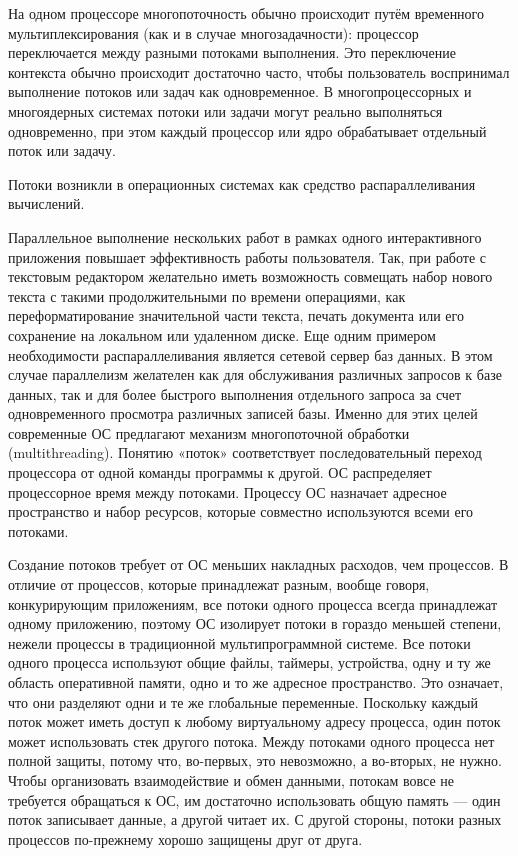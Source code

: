 \documentclass[a4paper,12pt]{report}
\begin{document}
На одном процессоре многопоточность обычно происходит путём временного мультиплексирования (как и в случае многозадачности): процессор переключается между разными потоками выполнения. Это переключение контекста обычно происходит достаточно часто, чтобы пользователь воспринимал выполнение потоков или задач как одновременное. В многопроцессорных и многоядерных системах потоки или задачи могут реально выполняться одновременно, при этом каждый процессор или ядро обрабатывает отдельный поток или задачу.

Потоки возникли в операционных системах как средство распараллеливания вычислений.

Параллельное выполнение нескольких работ в рамках одного интерактивного приложения повышает эффективность работы пользователя. Так, при работе с текстовым редактором желательно иметь возможность совмещать набор нового текста с такими продолжительными по времени операциями, как переформатирование значительной части текста, печать документа или его сохранение на локальном или удаленном диске. Еще одним примером необходимости распараллеливания является сетевой сервер баз данных. В этом случае параллелизм желателен как для обслуживания различных запросов к базе данных, так и для более быстрого выполнения отдельного запроса за счет одновременного просмотра различных записей базы. Именно для этих целей современные ОС предлагают механизм многопоточной обработки (multithreading). Понятию «поток» соответствует последовательный переход процессора от одной команды программы к другой. ОС распределяет процессорное время между потоками. Процессу ОС назначает адресное пространство и набор ресурсов, которые совместно используются всеми его потоками. 

Создание потоков требует от ОС меньших накладных расходов, чем процессов. В отличие от процессов, которые принадлежат разным, вообще говоря, конкурирующим приложениям, все потоки одного процесса всегда принадлежат одному приложению, поэтому ОС изолирует потоки в гораздо меньшей степени, нежели процессы в традиционной мультипрограммной системе. Все потоки одного процесса используют общие файлы, таймеры, устройства, одну и ту же область оперативной памяти, одно и то же адресное пространство. Это означает, что они разделяют одни и те же глобальные переменные. Поскольку каждый поток может иметь доступ к любому виртуальному адресу процесса, один поток может использовать стек другого потока. Между потоками одного процесса нет полной защиты, потому что, во-первых, это невозможно, а во-вторых, не нужно. Чтобы организовать взаимодействие и обмен данными, потокам вовсе не требуется обращаться к ОС, им достаточно использовать общую память — один поток записывает данные, а другой читает их. С другой стороны, потоки разных процессов по-прежнему хорошо защищены друг от друга.
\end{document}
